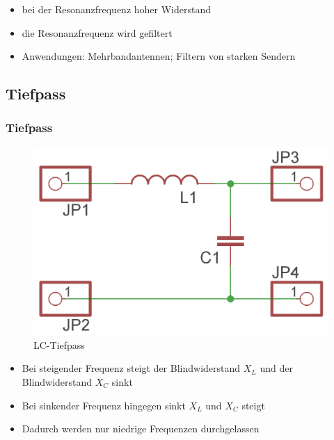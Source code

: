 \begin{frame}
\begin{center}
\begin{columns}
\begin{figure}
      \end{figure}
    \end{columns}
  \end{center}
  \pause
  \begin{itemize}
    \item bei der Resonanzfrequenz hoher Widerstand
    \item die Resonanzfrequenz wird gefiltert
    \item Anwendungen: Mehrbandantennen; Filtern von starken Sendern
  \end{itemize}
\end{frame}


\subsection*{Tiefpass}
\begin{frame}
  \frametitle{Tiefpass}
  \begin{center}
    \begin{figure}
      \includegraphics[width=\textwidth,height=.45\textheight,keepaspectratio]{e07/LC-Tiefpass.png}
      \caption{LC-Tiefpass}
    \end{figure}
  \end{center}
  \begin{itemize}
    \item Bei steigender Frequenz steigt der Blindwiderstand $X_L$ und der Blindwiderstand $X_C$ sinkt
    \item Bei sinkender Frequenz hingegen sinkt $X_L$ und $X_C$ steigt
    \item Dadurch werden nur niedrige Frequenzen durchgelassen
  \end{itemize}
\end{frame}

